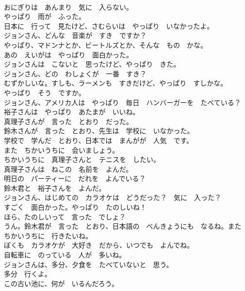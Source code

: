 \documentclass[8pt]{extreport}
\begin{document}
\begin{CJK}{UTF8}{min}
\\	おにぎりは　あんまり　気に　入らない。	
\\	やっぱり　雨が　ふった。	
\\	日本に　行って　見たけど、さむらいは　やっぱり　いなかったよ。	
\\	ジョンさん、どんな　音楽が　すき　ですか？	
\\	やっぱり、マドンナとか、ビートルズとか、そんな　もの　かな。	
\\	あの　えいがは　やっぱり　面白かった。	
\\	ジョンさんは　こないと　思ったけど、やっぱり　きた。	
\\	ジョンさん、どの　わしょくが　一番　すき？	
\\	むずかしいな。すしも、ラーメンも　すきだけど、やっぱり　すしかな。	
\\	やっぱり　そう　ですか。	
\\	ジョンさん、アメリカ人は　やっぱり　毎日　ハンバーガーを　たべている？	
\\	裕子さんは　やっぱり　あたまが　いいね。	
\\	真理子さんが　言った　とおり　だった。	
\\	鈴木さんが　言った　とおり、先生は　学校に　いなかった。	
\\	学校で　学んだ　とおり、日本では　まんがが　人気　です。	
\\	また　ちかいうちに　会いましょう。	
\\	ちかいうちに　真理子さんと　テニスを　したい。	
\\	真理子さんは　ねこの　名前を　よんだ。	
\\	明日の　パーティーに　だれを　よんでいる？	
\\	鈴木君と　裕子さんを　よんだ。	
\\	ジョンさん、はじめての　カラオケは　どうだった？　気に　入った？	
\\	すごく　面白かった。やっぱり　たのしいね！	
\\	ほら、たのしいって　言った　でしょ？	
\\	うん。鈴木君が　言った　とおり、日本語の　べんきょうにも　なるね。また　ちかいうちに　行きたいね。	
\\	ぼくも　カラオケが　大好き　だから、いつでも　よんでね。	
\\	自転車に　のっている　人が　多いね。	
\\	ジョンさんは、多分、夕食を　たべていないと　思う。	
\\	多分　行くよ。	
\\	この古い池に、何が　いるんだろう。	

\end{CJK}
\end{document}
